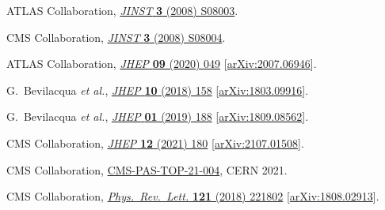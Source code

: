 \documentclass[12pt]{article}
\newcommand{\mybar}[1]{\smash{$\bar{\text{#1}}$}}
\newcommand{\tbar}{\mybar{t}}
\newcommand{\ttbar}{t\tbar}
\newcommand{\mygamma}{\textgamma\xspace}
\newcommand{\mymu}{\textmu\xspace}
\newcommand{\TeV}{\,TeV\xspace}
\newcommand{\sqrts}[1][13]{$\sqrt{s}=#1$\TeV}
\begin{document}
\begin{thebibliography}{99}
\newcommand{\doi}[2]{\href{http://doi.org/#1}{#2}}
\newcommand{\arxiv}[1]{\href{http://arxiv.org/abs/#1}{arXiv:#1}}
\newcommand{\pas}[1]{\href{http://cms-results.web.cern.ch/cms-results/public-results/preliminary-results/#1/index.html}{CMS-PAS-#1}}
\newcommand{\etal}{\textit{et al.}}
\newcommand{\titl}[1]{}
\newcommand{\jrnl}[1]{\textit{#1}\xspace}
\newcommand{\vlme}[1]{\textbf{#1}\xspace}
\setlength{\itemsep}{-0.5\parskip}

ATLAS Collaboration,
\titl{The ATLAS experiment at the CERN Large Hadron Collider}%
\doi{10.1088/1748-0221/3/08/S08003}{\jrnl{JINST} \vlme{3} (2008) S08003}.

CMS Collaboration,
\titl{The CMS experiment at the CERN LHC}%
\doi{10.1088/1748-0221/3/08/S08004}{\jrnl{JINST} \vlme{3} (2008) S08004}.

ATLAS Collaboration,
\titl{Measurements of inclusive and differential cross-sections of combined \ttbar\mygamma and tW\mygamma production in the e\mymu channel at 13\TeV with the ATLAS detector}%
\doi{10.1007/JHEP09(2020)049}{\jrnl{JHEP} \vlme{09} (2020) 049}
[\arxiv{2007.06946}].

G.\ Bevilacqua \etal,
\titl{Hard photons in hadroproduction of top quarks with realistic final states}%
\doi{10.1007/JHEP10(2018)158}{\jrnl{JHEP} \vlme{10} (2018) 158}
[\arxiv{1803.09916}].

G.\ Bevilacqua \etal,
\titl{Precise predictions for the $\text{\ttbar\mygamma}/\text{\ttbar}$ cross section ratios at the LHC}%
\doi{10.1007/JHEP01(2019)188}{\jrnl{JHEP} \vlme{01} (2019) 188}
[\arxiv{1809.08562}].

CMS Collaboration,
\titl{Measurement of the inclusive and differential \ttbar\mygamma cross sections in the single-lepton channel and EFT interpretation at \sqrts}%
\doi{10.1007/JHEP12(2021)180}{\jrnl{JHEP} \vlme{12} (2021) 180}
[\arxiv{2107.01508}].

CMS Collaboration,
\titl{Measurement of the inclusive and differential \ttbar\mygamma cross section and EFT interpretation in the dilepton channel at \sqrts}%
\pas{TOP-21-004},
CERN 2021.

CMS Collaboration,
\titl{Evidence for the associated production of a single top quark and a photon in proton-proton collisions at \sqrts}%
\doi{10.1103/PhysRevLett.121.221802}{\jrnl{Phys.\ Rev.\ Lett.} \vlme{121} (2018) 221802}
[\arxiv{1808.02913}].


\end{thebibliography}
\end{document}
